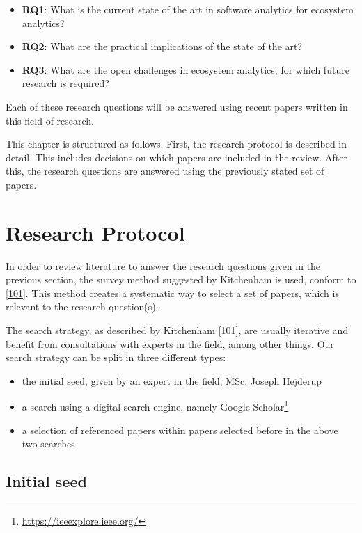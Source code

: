 \documentclass[]{book}
\providecommand{\tightlist}{%
  \setlength{\itemsep}{0pt}\setlength{\parskip}{0pt}}
\let\rmarkdownfootnote\footnote%
\def\footnote{\protect\rmarkdownfootnote}
\begin{document}
\begin{itemize}
\tightlist
\item
  \textbf{RQ1}: What is the current state of the art in software
  analytics for ecosystem analytics?
\item
  \textbf{RQ2}: What are the practical implications of the state of the
  art?
\item
  \textbf{RQ3}: What are the open challenges in ecosystem analytics, for
  which future research is required?
\end{itemize}

Each of these research questions will be answered using recent papers
written in this field of research.

This chapter is structured as follows. First, the research protocol is
described in detail. This includes decisions on which papers are
included in the review. After this, the research questions are answered
using the previously stated set of papers.

\section{Research Protocol}\label{research-protocol-2}

In order to review literature to answer the research questions given in
the previous section, the survey method suggested by Kitchenham is used,
conform to {[}\protect\hyperlink{ref-kitchenham2004procedures}{101}{]}.
This method creates a systematic way to select a set of papers, which is
relevant to the research question(s).

The search strategy, as described by Kitchenham
{[}\protect\hyperlink{ref-kitchenham2004procedures}{101}{]}, are usually
iterative and benefit from consultations with experts in the field,
among other things. Our search strategy can be split in three different
types:

\begin{itemize}
\tightlist
\item
  the initial seed, given by an expert in the field, MSc. Joseph
  Hejderup
\item
  a search using a digital search engine, namely Google
  Scholar\footnote{\url{https://ieeexplore.ieee.org/}}
\item
  a selection of referenced papers within papers selected before in the
  above two searches
\end{itemize}

\subsection{Initial seed}\label{initial-seed}
\end{document}
